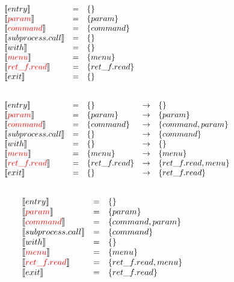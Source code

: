 \begin{frame}
\[
\begin{array}{lclcl}
  \constraint{entry} & = &  \{\} & \phantom{\rightarrow} & \phantom{hahahaha}\\
  \assignconstraint{param} & = & \{param\}&  & \\ 
  \assignconstraint{command} & = &\{command\}&  & \\
  \constraint{subprocess.call} & = & \{\}&  & \\
  \constraint{with} & = & \{\}&  & \\
  \assignconstraint{menu} & = &  \{menu\}&  & \\
  \assignconstraint{ret\_f.read} & = & \{ret\_f.read\}&  & \\
  \constraint{exit} & = & \{\}&  & \\
  && && \phantom{\{command, param\} \{command, param\}}
\end{array}
\]
\end{frame}

\begin{frame}
  \[
\begin{array}{lclcl}
  \constraint{entry} & = &  \{\} & \rightarrow & \{\}\\
  \assignconstraint{param} & = & \{param\}& \rightarrow & \{param\}\\ 
  \assignconstraint{command} & = &\{command\}& \rightarrow & \{command, param\}\\
  \constraint{subprocess.call} & = & \{\}& \rightarrow & \{command\}\\
  \constraint{with} & = & \{\}& \rightarrow & \{\}\\
  \assignconstraint{menu} & = &  \{menu \}& \rightarrow & \{menu\} \\
  \assignconstraint{ret\_f.read} & = & \{ret\_f.read\}& \rightarrow & \{ret\_f.read, menu\}\\
  \constraint{exit} & = & \{\}& \rightarrow & \{ret\_f.read\}\\
  && && \phantom{\{command, param\}\{command, param\}}
\end{array}
\]
\end{frame}


\begin{frame}
  \[
\begin{array}{lclcl}
  \constraint{entry} & = & \{\}& \phantom{\rightarrow} & \phantom{\{command, param\}} \\
  \assignconstraint{param} & = & \{param\}& \\ 
  \assignconstraint{command} & = & \{command, param\}& \\
  \constraint{subprocess.call} & = & \{command\}& \\
  \constraint{with} & = & \{\}& \\
  \assignconstraint{menu} & = & \{menu\} & \\
  \assignconstraint{ret\_f.read} & = & \{ret\_f.read, menu\}& \\
  \constraint{exit} & = & \{ret\_f.read\}& \\
  && \phantom{\{command, param\}} && \phantom{\{command, param\}}
\end{array}
\]
\end{frame}


